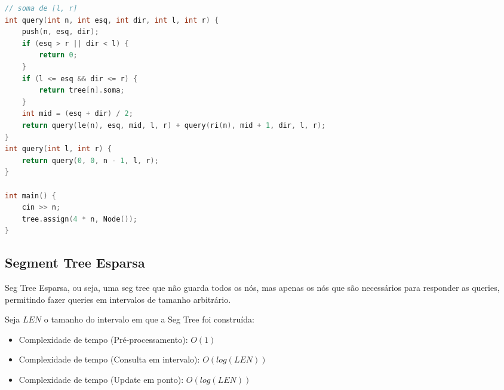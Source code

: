 \documentclass[11pt, a4paper, oneside]{book}
\begin{document}
\begin{multicols}{2}
\begin{lstlisting}[language=C++]
// soma de [l, r]
int query(int n, int esq, int dir, int l, int r) {
    push(n, esq, dir);
    if (esq > r || dir < l) {
        return 0;
    }
    if (l <= esq && dir <= r) {
        return tree[n].soma;
    }
    int mid = (esq + dir) / 2;
    return query(le(n), esq, mid, l, r) + query(ri(n), mid + 1, dir, l, r);
}
int query(int l, int r) {
    return query(0, 0, n - 1, l, r);
}

int main() {
    cin >> n;
    tree.assign(4 * n, Node());
}
\end{lstlisting}
\end{multicols}

\hfill

\subsection{Segment Tree Esparsa}


Seg Tree Esparsa, ou seja, uma seg tree que não guarda todos os nós, mas apenas os nós que são necessários para responder as queries, permitindo fazer queries em intervalos de tamanho arbitrário.



Seja $LEN$ o tamanho do intervalo em que a Seg Tree foi construída:



\begin{itemize}
\item Complexidade de tempo (Pré-processamento): $O(1)$
\item Complexidade de tempo (Consulta em intervalo): $O(log(LEN))$
\item Complexidade de tempo (Update em ponto): $O(log(LEN))$
\end{itemize}

\hfill
\end{document}
